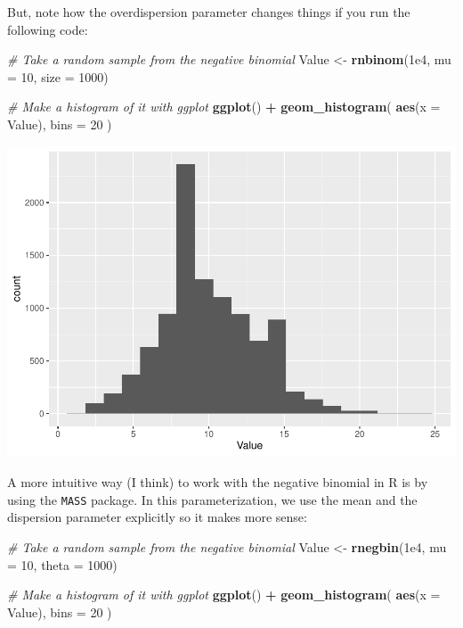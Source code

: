 \documentclass[
]{book}
\newenvironment{Shaded}{\begin{snugshade}}{\end{snugshade}}
\newcommand{\CommentTok}[1]{\textcolor[rgb]{0.56,0.35,0.01}{\textit{#1}}}
\newcommand{\DataTypeTok}[1]{\textcolor[rgb]{0.13,0.29,0.53}{#1}}
\newcommand{\DecValTok}[1]{\textcolor[rgb]{0.00,0.00,0.81}{#1}}
\newcommand{\FloatTok}[1]{\textcolor[rgb]{0.00,0.00,0.81}{#1}}
\newcommand{\KeywordTok}[1]{\textcolor[rgb]{0.13,0.29,0.53}{\textbf{#1}}}
\newcommand{\NormalTok}[1]{#1}
\newcommand{\OperatorTok}[1]{\textcolor[rgb]{0.81,0.36,0.00}{\textbf{#1}}}
\newcommand{\StringTok}[1]{\textcolor[rgb]{0.31,0.60,0.02}{#1}}
\begin{document}
But, note how the overdispersion parameter changes things if you run the following code:

\begin{Shaded}
\begin{Highlighting}[]
\CommentTok{# Take a random sample from the negative binomial}
\NormalTok{Value <-}\StringTok{ }\KeywordTok{rnbinom}\NormalTok{(}\FloatTok{1e4}\NormalTok{, }\DataTypeTok{mu =} \DecValTok{10}\NormalTok{, }\DataTypeTok{size =} \DecValTok{1000}\NormalTok{)}

\CommentTok{# Make a histogram of it with ggplot}
\KeywordTok{ggplot}\NormalTok{() }\OperatorTok{+}\StringTok{ }\KeywordTok{geom_histogram}\NormalTok{( }\KeywordTok{aes}\NormalTok{(}\DataTypeTok{x =}\NormalTok{ Value), }\DataTypeTok{bins =} \DecValTok{20}\NormalTok{ )}
\end{Highlighting}
\end{Shaded}

\includegraphics{worstr_files/figure-latex/unnamed-chunk-143-1.pdf}

A more intuitive way (I think) to work with the negative binomial in R is by using the \texttt{MASS} package. In this parameterization, we use the mean and the
dispersion parameter explicitly so it makes more sense:

\begin{Shaded}
\begin{Highlighting}[]
\CommentTok{# Take a random sample from the negative binomial}
\NormalTok{Value <-}\StringTok{ }\KeywordTok{rnegbin}\NormalTok{(}\FloatTok{1e4}\NormalTok{, }\DataTypeTok{mu =} \DecValTok{10}\NormalTok{, }\DataTypeTok{theta =} \DecValTok{1000}\NormalTok{)}

\CommentTok{# Make a histogram of it with ggplot}
\KeywordTok{ggplot}\NormalTok{() }\OperatorTok{+}\StringTok{ }\KeywordTok{geom_histogram}\NormalTok{( }\KeywordTok{aes}\NormalTok{(}\DataTypeTok{x =}\NormalTok{ Value), }\DataTypeTok{bins =} \DecValTok{20}\NormalTok{ )}
\end{Highlighting}
\end{Shaded}
\end{document}
